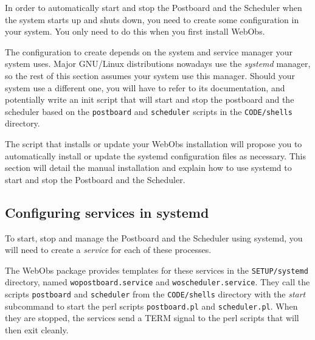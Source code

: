 In order to automatically start and stop the Postboard and the Scheduler when
the system starts up and shuts down, you need to create some configuration in
your system. You only need to do this when you first install WebObs.

The configuration to create depends on the system and service manager your
system uses. Major GNU/Linux distributions nowadays use the \textit{systemd}
manager, so the rest of this section assumes your system use this manager.
Should your system use a different one, you will have to refer to its
documentation, and potentially write an init script that will start and stop
the postboard and the scheduler based on the \texttt{postboard} and
\texttt{scheduler} scripts in the \texttt{CODE/shells} directory.

The  script that installs or update your WebObs installation will
propose you to automatically install or update the systemd configuration files
as necessary. This section will detail the manual installation and explain how
to use systemd to start and stop the Postboard and the Scheduler.

\subsection*{Configuring services in systemd}

To start, stop and manage the Postboard and the Scheduler using systemd, you
will need to create a \textit{service} for each of these processes.

The WebObs package provides templates for these services in the
\texttt{SETUP/systemd} directory, named \texttt{wopostboard.service} and
\texttt{woscheduler.service}. They call the scripts \texttt{postboard} and
\texttt{scheduler} from the \texttt{CODE/shells} directory with the
\textit{start} subcommand to start the perl scripts \texttt{postboard.pl} and
\texttt{scheduler.pl}. When they are stopped, the services send a TERM signal
to the perl scripts that will then exit cleanly.

